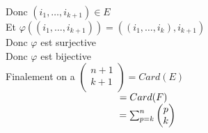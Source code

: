 \documentclass{article}
\newcommand\tab[1][1cm]{\hspace*{#1}}
\begin{document}
Donc $(i_1, \dots, i_{k+1}) \in E$\\
Et $\varphi((i_1, \dots, i_{k+1})) = ((i_1, \dots, i_k), i_{k+1})$\\
Donc $\varphi$ est surjective\\
Donc $\varphi$ est bijective\\
Finalement on a $\begin{pmatrix}
    n + 1\\
    k + 1\\
\end{pmatrix} = Card(E)$\\
$\tab[4.1cm] = Card(F)$\\
$\tab[4.1cm] = \sum_{p = k}^n \begin{pmatrix}
    p\\
    k\\
\end{pmatrix}$
\end{document}
